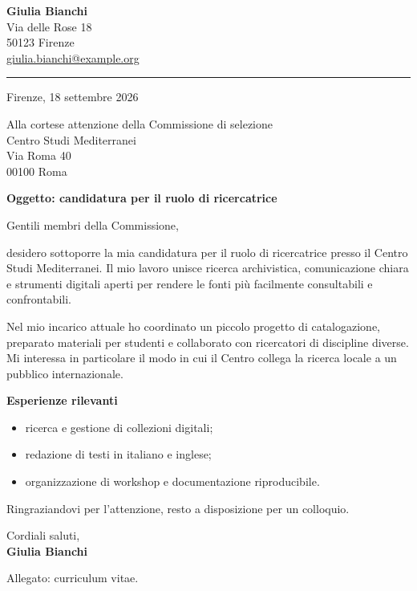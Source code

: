 \documentclass[11pt,a4paper]{article}
\newcommand{\motivo}[1]{\vspace{6pt}\textbf{\color{terra}#1}\par}
\begin{document}
\begin{flushright}
\textbf{Giulia Bianchi}\\
Via delle Rose 18\\50123 Firenze\\
\href{mailto:giulia.bianchi@example.org}{giulia.bianchi@example.org}
\end{flushright}
\vspace{8pt}\color{terra}\rule{\linewidth}{1pt}\color{black}

Firenze, 18 settembre 2026

Alla cortese attenzione della Commissione di selezione\\
Centro Studi Mediterranei\\Via Roma 40\\00100 Roma

\motivo{Oggetto: candidatura per il ruolo di ricercatrice}

Gentili membri della Commissione,

desidero sottoporre la mia candidatura per il ruolo di ricercatrice presso il
Centro Studi Mediterranei. Il mio lavoro unisce ricerca archivistica,
comunicazione chiara e strumenti digitali aperti per rendere le fonti più
facilmente consultabili e confrontabili.

Nel mio incarico attuale ho coordinato un piccolo progetto di catalogazione,
preparato materiali per studenti e collaborato con ricercatori di discipline
diverse. Mi interessa in particolare il modo in cui il Centro collega la
ricerca locale a un pubblico internazionale.

\motivo{Esperienze rilevanti}
\begin{itemize}
\item ricerca e gestione di collezioni digitali;
\item redazione di testi in italiano e inglese;
\item organizzazione di workshop e documentazione riproducibile.
\end{itemize}

Ringraziandovi per l'attenzione, resto a disposizione per un colloquio.

Cordiali saluti,\\[1.2em]\textbf{Giulia Bianchi}

\vfill\small\textcolor{terra}{Allegato: curriculum vitae.}
\end{document}
